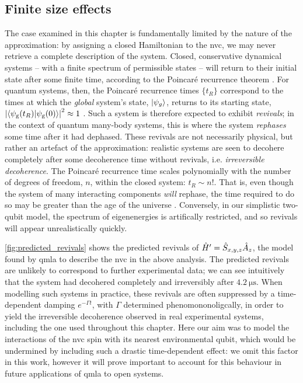 \subsection{Finite size effects}
The case examined in this chapter is fundamentally limited by the nature of the approximation: 
    by assigning a closed Hamiltonian to the \gls{nvc}, 
    we may never retrieve a complete description of the system. 
Closed, conservative  dynamical systems -- with a finite spectrum of permissible states -- 
    will return to their initial state after some finite time, 
    according to the Poincar\'e recurrence theorem \cite{breuer2002theory}.
For quantum systems, then, the Poincar\'e recurrence times $\{t_R\}$ correspond to the times at which 
    the \emph{global} system's state, $\ket{\psi_g}$, returns to its starting state, 
    $\left\lvert \braket{\psi_{\rm{g}}(t_R) | \psi_{\rm{g}}(0)} \right\rvert^2 \approx 1$
    \cite{gentile2020Operating}.
Such a system is therefore expected to exhibit \emph{revivals}; 
    in the context of quantum many-body systems,
    this is where the system \emph{rephases} some time after it had dephased. 
These revivals are not necessarily physical, 
    but rather an artefact of the approximation:
    realistic systems are seen to decohere completely after some decoherence time
    without revivals, i.e. \emph{irreversible decoherence}. 
The Poincar\'e recurrence time scales polynomially with the number of degrees of freedom, $n$,
    within the closed system:  $t_R \sim n!$. 
That is, even though the system of many interacting components \emph{will} rephase, 
    the time required to do so may be greater than the age of the universe \cite{schlosshauer2005decoherence}. 
Conversely, in our simplistic two-qubit model, the spectrum of eigenenergies is artifically restricted, 
    and so revivals will appear unrealistically quickly. 
\par 
\cref{fig:predicted_revivals} shows the predicted revivals of $\hat{H}^{\prime} = \hat{S}_{x,y,z}\hat{A}_z$, 
    the model found by \gls{qmla} to describe the \gls{nvc} in the above analysis. 
The predicted revivals are unlikely to correspond to further experimental data; 
    we can see intuitively that the system had decohered completely and irreversibly 
    after $\SI{4.2}{\micro\second}$.
When modelling such systems in practice, these revivals are often suppressed by a 
    time-dependent damping $e^{-\Gamma t}$, with $\Gamma$ determined phenomononoligcally,
    in order to yield the irreversible decoherence observed in real experimental systems,
    including the one used throughout this chapter. 
Here our aim was to model the interactions of the \gls{nvc} spin with its nearest environmental qubit,
    which would be undermined by including such a drastic time-dependent effect:
    we omit this factor in this work, 
    however it will prove important to account for this behaviour in future applications of \gls{qmla} to open systems.     

